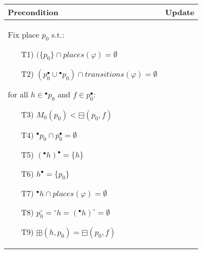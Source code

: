 \begin{figure}[h!]
\begin{tikzpicture}
    \end{tikzpicture}
    \vspace{5mm}
    \begin{adjustbox}{center}
        \begin{tabular}{|p{75mm}|p{75mm}|} \hline
        Precondition & Update \\ \hline
        Fix place $p_0$ s.t.:
        \begin{itemize}[leftmargin=10mm]
            \item[T1)] $(\{p_0\} \cap places(\varphi) = \emptyset$
            \item[T2)] $(p_0^\bullet \cup {}^\bullet p_0) \cap transitions(\varphi) = \emptyset$
        \end{itemize}
        \noindent for all $h\in{}^\bullet p_0$ and $f \in p_0^\bullet$:
        \begin{itemize}[leftmargin=10mm]
            \item[T3)] $M_0(p_0) < \boxminus(p_0,f)$
            \item[T4)] $^\bullet p_0 \cap p_0^\bullet = \emptyset$
            \item[T5)] $({}^\bullet h)^\bullet = \{h\}$
            \item[T6)] $h^\bullet=\{p_0\}$
            \item[T7)] ${}^\bullet h \cap places(\varphi) = \emptyset$
            \item[T8)] $p_0^\circ = {}^\circ h = ({}^\bullet h)^\circ = \emptyset$
            \item[T9)] $\boxplus(h, p_0) = \boxminus(p_0,f)$
        \end{itemize}



\end{tabular}
\end{adjustbox}
\end{figure}
